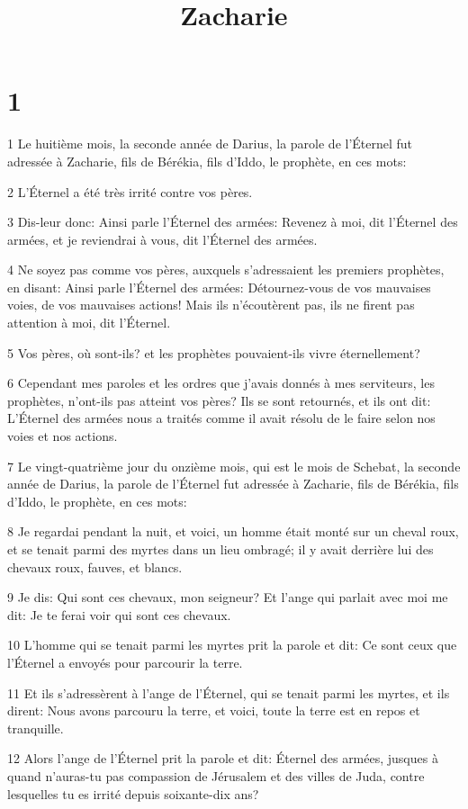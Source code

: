 

\title{Zacharie}


\chapter{1}

\par 1 Le huitième mois, la seconde année de Darius, la parole de l'Éternel fut adressée à Zacharie, fils de Bérékia, fils d'Iddo, le prophète, en ces mots:
\par 2 L'Éternel a été très irrité contre vos pères.
\par 3 Dis-leur donc: Ainsi parle l'Éternel des armées: Revenez à moi, dit l'Éternel des armées, et je reviendrai à vous, dit l'Éternel des armées.
\par 4 Ne soyez pas comme vos pères, auxquels s'adressaient les premiers prophètes, en disant: Ainsi parle l'Éternel des armées: Détournez-vous de vos mauvaises voies, de vos mauvaises actions! Mais ils n'écoutèrent pas, ils ne firent pas attention à moi, dit l'Éternel.
\par 5 Vos pères, où sont-ils? et les prophètes pouvaient-ils vivre éternellement?
\par 6 Cependant mes paroles et les ordres que j'avais donnés à mes serviteurs, les prophètes, n'ont-ils pas atteint vos pères? Ils se sont retournés, et ils ont dit: L'Éternel des armées nous a traités comme il avait résolu de le faire selon nos voies et nos actions.
\par 7 Le vingt-quatrième jour du onzième mois, qui est le mois de Schebat, la seconde année de Darius, la parole de l'Éternel fut adressée à Zacharie, fils de Bérékia, fils d'Iddo, le prophète, en ces mots:
\par 8 Je regardai pendant la nuit, et voici, un homme était monté sur un cheval roux, et se tenait parmi des myrtes dans un lieu ombragé; il y avait derrière lui des chevaux roux, fauves, et blancs.
\par 9 Je dis: Qui sont ces chevaux, mon seigneur? Et l'ange qui parlait avec moi me dit: Je te ferai voir qui sont ces chevaux.
\par 10 L'homme qui se tenait parmi les myrtes prit la parole et dit: Ce sont ceux que l'Éternel a envoyés pour parcourir la terre.
\par 11 Et ils s'adressèrent à l'ange de l'Éternel, qui se tenait parmi les myrtes, et ils dirent: Nous avons parcouru la terre, et voici, toute la terre est en repos et tranquille.
\par 12 Alors l'ange de l'Éternel prit la parole et dit: Éternel des armées, jusques à quand n'auras-tu pas compassion de Jérusalem et des villes de Juda, contre lesquelles tu es irrité depuis soixante-dix ans?
